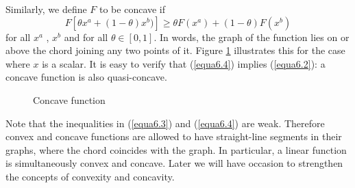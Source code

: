 Similarly, we define $F$ to be concave if 
\begin{equation} \label{equa6.4}
 F[\theta x^a + (1-\theta) x^b)  ] \geq \theta F(x^a) + (1-\theta) F(x^b)  
\end{equation}
for all $x^a$ , $x^b$ and for all $\theta \in [0,1]$. In words, the graph of the function lies on or above the chord joining any two points of it. Figure \ref{Fig6.2} illustrates this for the case where $x$ is a scalar. It is easy to verify that (\ref{equa6.4}) implies (\ref{equa6.2}): a concave function is also quasi-concave.
\begin{figure}[!htb] %
\centering %
\caption{Concave function} %
\label{Fig6.2} %
\end{figure}

Note that the inequalities in (\ref{equa6.3}) and (\ref{equa6.4}) are weak. Therefore convex and concave functions are allowed to have straight-line segments in their graphs, where the chord coincides with the graph. In particular, a linear function is simultaneously convex and concave. Later we will have occasion to strengthen the concepts of convexity and concavity.

